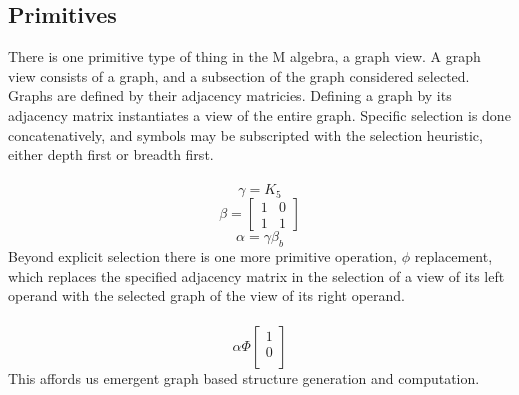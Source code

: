 \documentclass{article}
\begin{document}
	\subsection{Primitives}
	There is one primitive type of thing in the M algebra, a graph view. A graph view consists of a graph, and a subsection of the graph considered selected. Graphs are defined by their adjacency matricies. Defining a graph by its adjacency matrix instantiates a view of the entire graph. Specific selection is done concatenatively, and symbols may be subscripted with the selection heuristic, either depth first or breadth first.\\\\
	$$\gamma = K_5$$
	$$\beta = \begin{bmatrix}
		1 & 0 \\
		1 & 1 
		\end{bmatrix}$$
	$$\alpha = \gamma \beta_b$$
	Beyond explicit selection there is one more primitive operation, $\phi$ replacement, which replaces the specified adjacency matrix in the selection of a view of its left operand with the selected graph of the view of its right operand.\\\\
	$$\alpha \Phi \begin{bmatrix}
		1 \\
		0 \\
	\end{bmatrix}$$
	This affords us emergent graph based structure generation and computation. 
\end{document}
